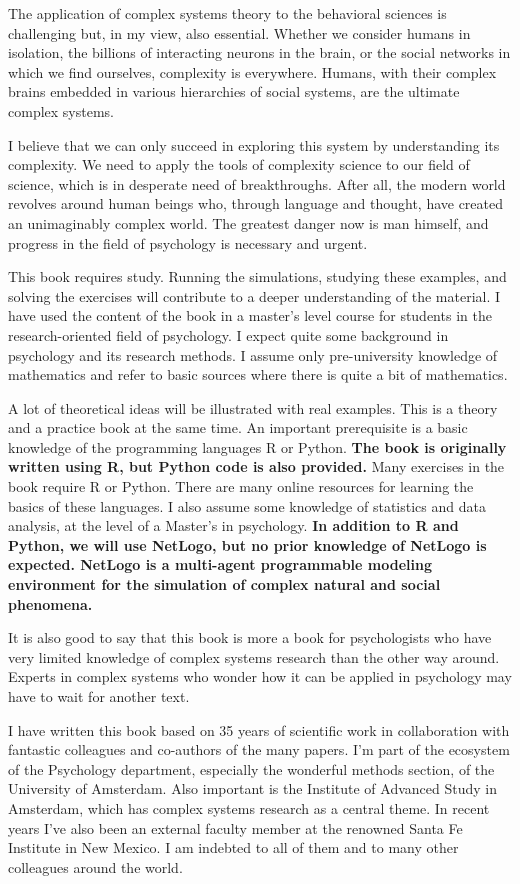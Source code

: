 \documentclass[
  a4paper,
  DIV=11,
  numbers=noendperiod,
  oneside]{scrreprt}
\begin{document}
The application of complex systems theory to the behavioral sciences is
challenging but, in my view, also essential. Whether we consider humans
in isolation, the billions of interacting neurons in the brain, or the
social networks in which we find ourselves, complexity is everywhere.
Humans, with their complex brains embedded in various hierarchies of
social systems, are the ultimate complex systems.

I believe that we can only succeed in exploring this system by
understanding its complexity. We need to apply the tools of complexity
science to our field of science, which is in desperate need of
breakthroughs. After all, the modern world revolves around human beings
who, through language and thought, have created an unimaginably complex
world. The greatest danger now is man himself, and progress in the field
of psychology is necessary and urgent.

This book requires study. Running the simulations, studying these
examples, and solving the exercises will contribute to a deeper
understanding of the material. I have used the content of the book in a
master's level course for students in the research-oriented field of
psychology. I expect quite some background in psychology and its
research methods. I assume only pre-university knowledge of mathematics
and refer to basic sources where there is quite a bit of mathematics.

A lot of theoretical ideas will be illustrated with real examples. This
is a theory and a practice book at the same time. An important
prerequisite is a basic knowledge of the programming languages R or
Python. \textbf{The book is originally written using R, but Python code
is also provided.} Many exercises in the book require R or Python. There
are many online resources for learning the basics of these languages. I
also assume some knowledge of statistics and data analysis, at the level
of a Master's in psychology. \textbf{In addition to R and Python, we
will use NetLogo, but no prior knowledge of NetLogo is expected. NetLogo
is a multi-agent programmable modeling environment for the simulation of
complex natural and social phenomena.}

It is also good to say that this book is more a book for psychologists
who have very limited knowledge of complex systems research than the
other way around. Experts in complex systems who wonder how it can be
applied in psychology may have to wait for another text.

I have written this book based on 35 years of scientific work in
collaboration with fantastic colleagues and co-authors of the many
papers. I'm part of the ecosystem of the Psychology department,
especially the wonderful methods section, of the University of
Amsterdam. Also important is the Institute of Advanced Study in
Amsterdam, which has complex systems research as a central theme. In
recent years I've also been an external faculty member at the renowned
Santa Fe Institute in New Mexico. I am indebted to all of them and to
many other colleagues around the world.
\end{document}
